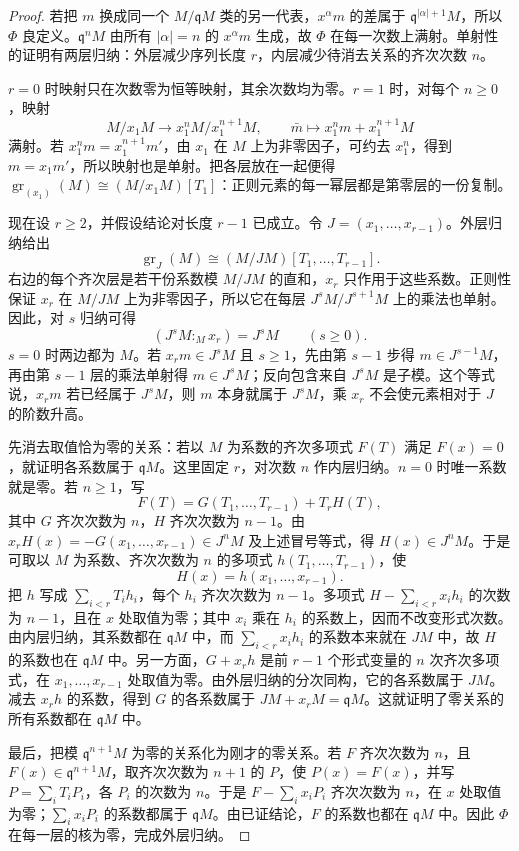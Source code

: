 \begin{proof}
	若把 \(m\) 换成同一个 \(M/\mathfrak qM\) 类的另一代表，\(x^\alpha m\) 的差属于 \(\mathfrak q^{|\alpha|+1}M\)，所以 \(\Phi\) 良定义。\(\mathfrak q^nM\) 由所有 \(|\alpha|=n\) 的 \(x^\alpha m\) 生成，故 \(\Phi\) 在每一次数上满射。单射性的证明有两层归纳：外层减少序列长度 \(r\)，内层减少待消去关系的齐次次数 \(n\)。

	\(r=0\) 时映射只在次数零为恒等映射，其余次数均为零。\(r=1\) 时，对每个 \(n\ge0\)，映射
	\[
		M/x_1M\longrightarrow x_1^nM/x_1^{n+1}M, \qquad \bar m\longmapsto x_1^nm+x_1^{n+1}M
	\]
	满射。若 \(x_1^nm=x_1^{n+1}m'\)，由 \(x_1\) 在 \(M\) 上为非零因子，可约去 \(x_1^n\)，得到 \(m=x_1m'\)，所以映射也是单射。把各层放在一起便得 \(\operatorname{gr}_{(x_1)}(M)\cong(M/x_1M)[T_1]\)：正则元素的每一幂层都是第零层的一份复制。

	现在设 \(r\ge2\)，并假设结论对长度 \(r-1\) 已成立。令 \(J=(x_1,\ldots,x_{r-1})\)。外层归纳给出
	\[
		\operatorname{gr}_J(M)\cong(M/JM)[T_1,\ldots,T_{r-1}].
	\]
	右边的每个齐次层是若干份系数模 \(M/JM\) 的直和，\(x_r\) 只作用于这些系数。正则性保证 \(x_r\) 在 \(M/JM\) 上为非零因子，所以它在每层 \(J^sM/J^{s+1}M\) 上的乘法也单射。因此，对 \(s\) 归纳可得
	\[
		(J^sM:_Mx_r)=J^sM\qquad(s\ge0).
	\]
	\(s=0\) 时两边都为 \(M\)。若 \(x_rm\in J^sM\) 且 \(s\ge1\)，先由第 \(s-1\) 步得 \(m\in J^{s-1}M\)，再由第 \(s-1\) 层的乘法单射得 \(m\in J^sM\)；反向包含来自 \(J^sM\) 是子模。这个等式说，\(x_rm\) 若已经属于 \(J^sM\)，则 \(m\) 本身就属于 \(J^sM\)，乘 \(x_r\) 不会使元素相对于 \(J\) 的阶数升高。

	先消去取值恰为零的关系：若以 \(M\) 为系数的齐次多项式 \(F(T)\) 满足 \(F(x)=0\)，就证明各系数属于 \(\mathfrak qM\)。这里固定 \(r\)，对次数 \(n\) 作内层归纳。\(n=0\) 时唯一系数就是零。若 \(n\ge1\)，写
	\[
		F(T)=G(T_1,\ldots,T_{r-1})+T_rH(T),
	\]
	其中 \(G\) 齐次次数为 \(n\)，\(H\) 齐次次数为 \(n-1\)。由 \(x_rH(x)=-G(x_1,\ldots,x_{r-1})\in J^nM\) 及上述冒号等式，得 \(H(x)\in J^nM\)。于是可取以 \(M\) 为系数、齐次次数为 \(n\) 的多项式 \(h(T_1,\ldots,T_{r-1})\)，使
	\[
		H(x)=h(x_1,\ldots,x_{r-1}).
	\]
	把 \(h\) 写成 \(\sum_{i<r}T_ih_i\)，每个 \(h_i\) 齐次次数为 \(n-1\)。多项式 \(H-\sum_{i<r}x_ih_i\) 的次数为 \(n-1\)，且在 \(x\) 处取值为零；其中 \(x_i\) 乘在 \(h_i\) 的系数上，因而不改变形式次数。由内层归纳，其系数都在 \(\mathfrak qM\) 中，而 \(\sum_{i<r}x_ih_i\) 的系数本来就在 \(JM\) 中，故 \(H\) 的系数也在 \(\mathfrak qM\) 中。另一方面，\(G+x_rh\) 是前 \(r-1\) 个形式变量的 \(n\) 次齐次多项式，在 \(x_1,\ldots,x_{r-1}\) 处取值为零。由外层归纳的分次同构，它的各系数属于 \(JM\)。减去 \(x_rh\) 的系数，得到 \(G\) 的各系数属于 \(JM+x_rM=\mathfrak qM\)。这就证明了零关系的所有系数都在 \(\mathfrak qM\) 中。

	最后，把模 \(\mathfrak q^{n+1}M\) 为零的关系化为刚才的零关系。若 \(F\) 齐次次数为 \(n\)，且 \(F(x)\in\mathfrak q^{n+1}M\)，取齐次次数为 \(n+1\) 的 \(P\)，使 \(P(x)=F(x)\)，并写 \(P=\sum_iT_iP_i\)，各 \(P_i\) 的次数为 \(n\)。于是 \(F-\sum_ix_iP_i\) 齐次次数为 \(n\)，在 \(x\) 处取值为零；\(\sum_ix_iP_i\) 的系数都属于 \(\mathfrak qM\)。由已证结论，\(F\) 的系数也都在 \(\mathfrak qM\) 中。因此 \(\Phi\) 在每一层的核为零，完成外层归纳。
\end{proof}

